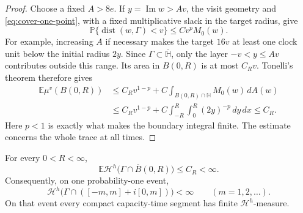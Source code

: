 \begin{proof}
Choose a fixed \(A>8e\).  If \(y=\operatorname{Im}w>Av\),
the visit geometry and \eqref{eq:cover-one-point}, with a fixed
multiplicative slack in the target radius, give
\[
 \mathbb P\{\operatorname{dist}(w,\Gamma)<v\}
       \le C v^p M_0(w).
\]
For example, increasing \(A\) if necessary makes the target
\(16v\) at least one clock unit below the initial radius \(2y\).
Since \(\Gamma\subset\overline{\mathbb H}\), only the layer
\(-v<y\le Av\) contributes outside this range.  Its area in
\(B(0,R)\) is at most \(C_Rv\).  Tonelli's theorem therefore gives
\begin{align*}
 \mathbb E\mu^v(B(0,R))
 &\le C_Rv^{1-p}
       +C\int_{B(0,R)\cap\mathbb H}M_0(w)\,dA(w)\\
 &\le C_Rv^{1-p}
       +C\int_{-R}^{R}\int_0^R(2y)^{-p}\,dy\,dx
 \le C_R.
\end{align*}
Here \(p<1\) is exactly what makes the boundary integral finite.
The estimate concerns the whole trace at all times.
\end{proof}

\begin{proposition}
\label{prop:dense-cover-upper}
For every \(0<R<\infty\),
\begin{equation}
 \mathbb E\mathcal H^h
       \bigl(\Gamma\cap\overline B(0,R)\bigr)\le C_R<\infty.
 \label{eq:cover-all-time-expectation}
\end{equation}
Consequently, on one probability-one event,
\[
 \mathcal H^h\bigl(\Gamma\cap([-m,m]+i[0,m])\bigr)<\infty
       \qquad(m=1,2,\ldots).
\]
On that event every compact capacity-time segment has finite
\(\mathcal H^h\)-measure.
\end{proposition}

